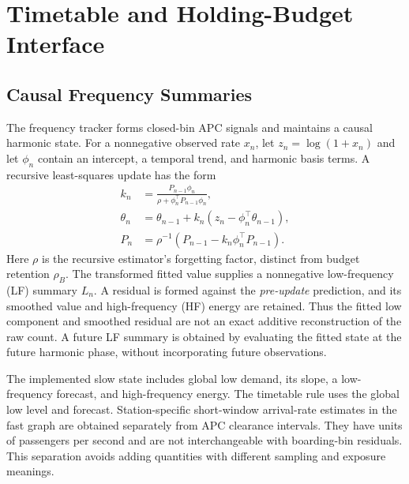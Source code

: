 \section{Timetable and Holding-Budget Interface}
\label{sec:method}

\subsection{Causal Frequency Summaries}
The frequency tracker forms closed-bin APC signals and maintains a causal harmonic state. For a nonnegative observed rate $x_n$, let $z_n=\log(1+x_n)$ and let $\phi_n$ contain an intercept, a temporal trend, and harmonic basis terms. A recursive least-squares update has the form
\begin{align}
 k_n&=\frac{P_{n-1}\phi_n}{\rho+\phi_n^\top P_{n-1}\phi_n},\\
 \theta_n&=\theta_{n-1}+k_n(z_n-\phi_n^\top\theta_{n-1}),\\
 P_n&=\rho^{-1}(P_{n-1}-k_n\phi_n^\top P_{n-1}).
\end{align}
Here $\rho$ is the recursive estimator's forgetting factor, distinct from budget retention $\rho_B$. The transformed fitted value supplies a nonnegative low-frequency (LF) summary $L_n$. A residual is formed against the \emph{pre-update} prediction, and its smoothed value and high-frequency (HF) energy are retained. Thus the fitted low component and smoothed residual are not an exact additive reconstruction of the raw count. A future LF summary is obtained by evaluating the fitted state at the future harmonic phase, without incorporating future observations.

The implemented slow state includes global low demand, its slope, a low-frequency forecast, and high-frequency energy. The timetable rule uses the global low level and forecast. Station-specific short-window arrival-rate estimates in the fast graph are obtained separately from APC clearance intervals. They have units of passengers per second and are not interchangeable with boarding-bin residuals. This separation avoids adding quantities with different sampling and exposure meanings.

